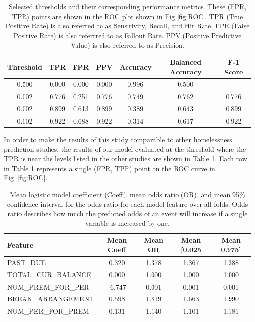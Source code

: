 \documentclass[10pt,letterpaper]{article}
\begin{document}
\begin{table}[htb]
    \centering
    \begin{tabular}{ccccccc}
        \toprule
        Threshold &   TPR &   FPR & PPV & Accuracy &  Balanced Accuracy & F-1 Score \\
        \midrule
        0.500 & 0.000 & 0.000 & 0.000 &     0.996 &     0.500 &   -   \\
        0.002 & 0.776 & 0.251 & 0.776 &     0.749 &     0.762 & 0.776 \\
        0.002 & 0.899 & 0.613 & 0.899 &     0.389 &     0.643 & 0.899 \\
        0.002 & 0.922 & 0.688 & 0.922 &     0.314 &     0.617 & 0.922 \\
        \bottomrule
    \end{tabular}
    \caption{Selected thresholds and their corresponding performance metrics. These (FPR, TPR) points are shown in the ROC plot shown in Fig \ref{fig:ROC}. TPR (True Positive Rate) is also referred to as Sensitivity, Recall, and Hit Rate. FPR (False Positive Rate) is also referrred to as Fallout Rate. PPV (Positive Predictive Value) is also referred to as Precision.}
    \label{tbl:performance}
\end{table}

In order to make the results of this study comparable to other homelessness prediction studies, the results of our model evaluated at the threshold where the TPR is near the levels listed in the other studies are shown in Table \ref{tbl:performance}. Each row in Table \ref{tbl:performance} represents a single (FPR, TPR) point on the ROC curve in Fig~\ref{fig:ROC}. 

\begin{table}[!h]
    \begin{tabular}{lcccc}
    \toprule
              Feature &  Mean Coeff &  Mean OR &  Mean [0.025 &  Mean 0.975] \\
    \midrule
    PAST\_DUE &                 0.320 &    1.378 &        1.367 &        1.388 \\
    TOTAL\_CUR\_BALANCE &       0.000 &    1.000 &        1.000 &        1.000 \\
    NUM\_PREM\_FOR\_PER &      -6.747 &    0.001 &        0.001 &        0.001 \\
    BREAK\_ARRANGEMENT &        0.598 &    1.819 &        1.663 &        1.990 \\
    NUM\_PER\_FOR\_PREM &       0.131 &    1.140 &        1.101 &        1.181 \\
    \bottomrule
    \end{tabular}
    \caption{Mean logistic model coefficient (Coeff), mean odds ratio (OR), and mean 95\% confidence interval for the odds ratio for each model feature over all folds. Odds ratio describes how much the predicted odds of an event will increase if a single variable is increased by one.}
    \label{tbl:meanParams}
\end{table}
\end{document}
